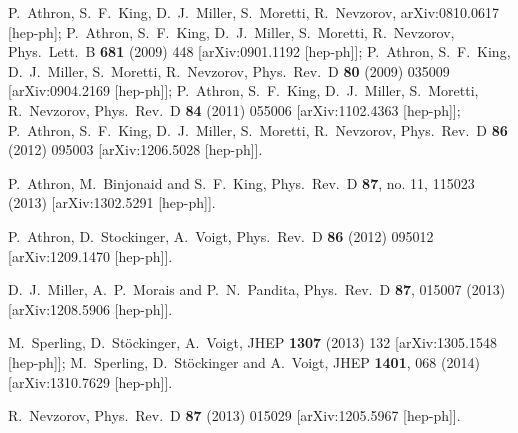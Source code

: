 \documentclass[12pt,a4paper]{article}
\begin{document}
\begin{thebibliography}{999}
P.~Athron, S.~F.~King, D.~J.~Miller, S.~Moretti, R.~Nevzorov,
arXiv:0810.0617 [hep-ph];
P.~Athron, S.~F.~King, D.~J.~Miller, S.~Moretti, R.~Nevzorov,
Phys.\ Lett.\  B {\bf 681} (2009) 448
[arXiv:0901.1192 [hep-ph]];
P.~Athron, S.~F.~King, D.~J.~Miller, S.~Moretti, R.~Nevzorov,
Phys.\ Rev.\  D {\bf 80} (2009) 035009
[arXiv:0904.2169 [hep-ph]];
P.~Athron, S.~F.~King, D.~J.~Miller, S.~Moretti, R.~Nevzorov,
Phys.\ Rev.\ D {\bf 84} (2011) 055006
[arXiv:1102.4363 [hep-ph]];
P.~Athron, S.~F.~King, D.~J.~Miller, S.~Moretti, R.~Nevzorov,
Phys.\ Rev.\ D {\bf 86} (2012) 095003
[arXiv:1206.5028 [hep-ph]].

  P.~Athron, M.~Binjonaid and S.~F.~King,
  Phys.\ Rev.\ D {\bf 87}, no. 11, 115023 (2013)
  [arXiv:1302.5291 [hep-ph]].

P.~Athron, D.~Stockinger,  A.~Voigt,
Phys.\ Rev.\ D {\bf 86} (2012) 095012
[arXiv:1209.1470 [hep-ph]].

  D.~J.~Miller, A.~P.~Morais and P.~N.~Pandita,
  Phys.\ Rev.\ D {\bf 87}, 015007 (2013)
  [arXiv:1208.5906 [hep-ph]].

M.~Sperling, D.~Stöckinger, A.~Voigt,
JHEP {\bf 1307} (2013) 132
[arXiv:1305.1548 [hep-ph]];
  M.~Sperling, D.~Stöckinger and A.~Voigt,
  JHEP {\bf 1401}, 068 (2014)
  [arXiv:1310.7629 [hep-ph]].

R.~Nevzorov,
Phys.\ Rev.\ D {\bf 87} (2013) 015029
[arXiv:1205.5967 [hep-ph]].




\end{thebibliography}
\end{document}
